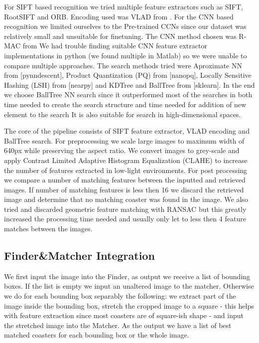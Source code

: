 \documentclass{article}
\begin{document}
For SIFT based recognition we tried multiple feature extractors such as SIFT, RootSIFT and ORB.
Encoding used was VLAD \cite{} from \cite{}.
For the CNN based recognition we limited ourselves to the Pre-trained CCNs since our dataset was relatively small and unsuitable for finetuning.
The CNN method chosen was R-MAC \cite{} from \cite{}
We had trouble finding suitable CNN feature extractor implementations in python (we found multiple in Matlab) so we were unable to compare multiple approaches.
The search methods tried were Aproximate NN from [pynndescent], Product Quantization (PQ) from [nanopq], Locally Sensitive Hashing (LSH) from [nearpy] and KDTree and BallTree from [sklearn].
In the end we choose BallTree NN search since it outperformed most of the searches in both time needed to create the search structure and time needed for addition of new element to the search
It is also suitable for search in high-dimensional spaces. 

The core of the pipeline consists of SIFT feature extractor, VLAD encoding and BallTree search.
For preprocessing we scale large images to maximum width of 640px while preserving the aspect ratio.
We convert images to grey-scale and apply Contrast Limited Adaptive Histogram Equalization (CLAHE) \cite{} to increase the number of features extracted in low-light environments. 
For post processing we compare a number of matching features between the inputted and retrieved images.
If number of matching features is less then 16 we discard the retrieved image and determine that no matching coaster was found in the image. 
We also tried and discarded geometric feature matching with RANSAC \cite{} but this greatly increased the processing time needed and usually only let to less then 4 feature matches between the images.


\subsection{Finder\&Matcher Integration}

We first input the image into the Finder, as output we receive a list of bounding boxes.
If the list is empty we input an unaltered image to the matcher.
Otherwise we do for each bounding box separably the following: 
we extract part of the image inside the bounding box, 
stretch the cropped image to a square - this helps with feature extraction since most coasters are of square-ish shape - 
and input the stretched image into the Matcher.
As the output we have a list of best matched coasters for each bounding box or the whole image. 
\end{document}
